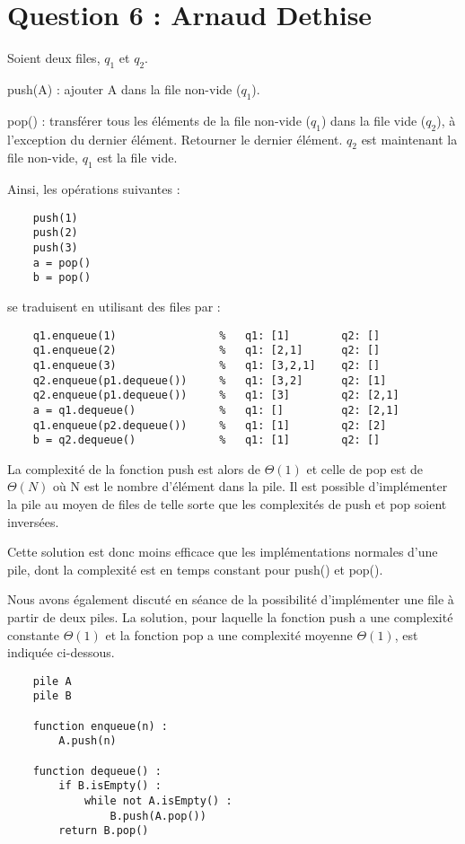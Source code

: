 \section*{Question 6 : Arnaud Dethise}

Soient deux files, $q_{1}$ et $q_{2}$.

push(A) : ajouter A dans la file non-vide ($q_{1}$).

pop() : transférer tous les éléments de la file non-vide ($q_{1}$) dans la file vide ($q_{2}$), à l'exception du dernier élément. Retourner le dernier élément. $q_{2}$ est maintenant la file non-vide, $q_{1}$ est la file vide.

\vspace{0.75cm}
Ainsi, les opérations suivantes :
\begin{lstlisting}
	push(1)
	push(2)
	push(3)
	a = pop()
	b = pop()
\end{lstlisting}
se traduisent en utilisant des files par :
\begin{lstlisting}
	q1.enqueue(1)                %   q1: [1]        q2: []
	q1.enqueue(2)                %   q1: [2,1]      q2: []
	q1.enqueue(3)                %   q1: [3,2,1]    q2: []
	q2.enqueue(p1.dequeue())     %   q1: [3,2]      q2: [1]
	q2.enqueue(p1.dequeue())     %   q1: [3]        q2: [2,1]
	a = q1.dequeue()             %   q1: []         q2: [2,1]
	q1.enqueue(p2.dequeue())     %   q1: [1]        q2: [2]
	b = q2.dequeue()             %   q1: [1]        q2: []
\end{lstlisting}

La complexité de la fonction push est alors de $\Theta(1)$ et celle de pop est de $\Theta(N)$ où N est le nombre d'élément dans la pile. Il est possible d'implémenter la pile au moyen de files de telle sorte que les complexités de push et pop soient inversées.

Cette solution est donc moins efficace que les implémentations normales d'une pile, dont la complexité est en temps constant pour push() et pop().

\vspace{0.75cm}
Nous avons également discuté en séance de la possibilité d'implémenter une file à partir de deux piles. La solution, pour laquelle la fonction push a une complexité constante $\Theta(1)$ et la fonction pop a une complexité moyenne $\Theta(1)$, est indiquée ci-dessous.

\begin{lstlisting}
	pile A
	pile B
	
	function enqueue(n) :
		A.push(n)
		
	function dequeue() :
		if B.isEmpty() :
			while not A.isEmpty() :
				B.push(A.pop())
		return B.pop()
\end{lstlisting}